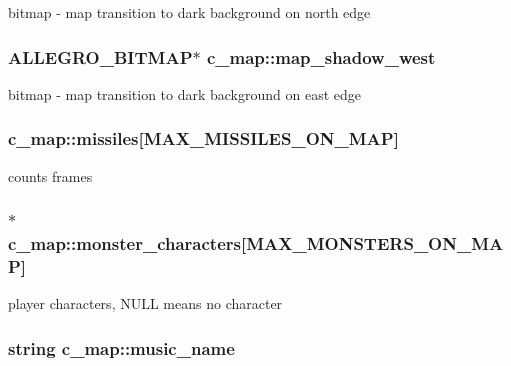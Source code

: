 bitmap -\/ map transition to dark background on north edge \hypertarget{classc__map_ad49b7ca28467f986d4b8a2e69ed1e15e}{
\subsubsection[{map\-\_\-shadow\-\_\-west}]{\setlength{\rightskip}{0pt plus 5cm}A\-L\-L\-E\-G\-R\-O\-\_\-\-B\-I\-T\-M\-A\-P$\ast$ c\-\_\-map\-::map\-\_\-shadow\-\_\-west\hspace{0.3cm}{\ttfamily [protected]}}}\label{classc__map_ad49b7ca28467f986d4b8a2e69ed1e15e}
bitmap -\/ map transition to dark background on east edge \hypertarget{classc__map_a7a421fc457cc901876cc7e8d0fbc13e8}{
\subsubsection[{missiles}]{ c\-\_\-map\-::missiles\mbox{[}M\-A\-X\-\_\-\-M\-I\-S\-S\-I\-L\-E\-S\-\_\-\-O\-N\-\_\-\-M\-A\-P\mbox{]}\hspace{0.3cm}{\ttfamily [protected]}}}\label{classc__map_a7a421fc457cc901876cc7e8d0fbc13e8}
counts frames \hypertarget{classc__map_af0168711e28d3671a9ef69003f3f0dc6}{
\subsubsection[{monster\-\_\-characters}]{$\ast$ c\-\_\-map\-::monster\-\_\-characters\mbox{[}M\-A\-X\-\_\-\-M\-O\-N\-S\-T\-E\-R\-S\-\_\-\-O\-N\-\_\-\-M\-A\-P\mbox{]}\hspace{0.3cm}{\ttfamily [protected]}}}\label{classc__map_af0168711e28d3671a9ef69003f3f0dc6}
player characters, N\-U\-L\-L means no character \hypertarget{classc__map_aeab133fe9c418a16af900492f8bf49a4}{
\subsubsection[{music\-\_\-name}]{\setlength{\rightskip}{0pt plus 5cm}string c\-\_\-map\-::music\-\_\-name\hspace{0.3cm}{\ttfamily [protected]}}}\label{classc__map_aeab133fe9c418a16af900492f8bf49a4}
